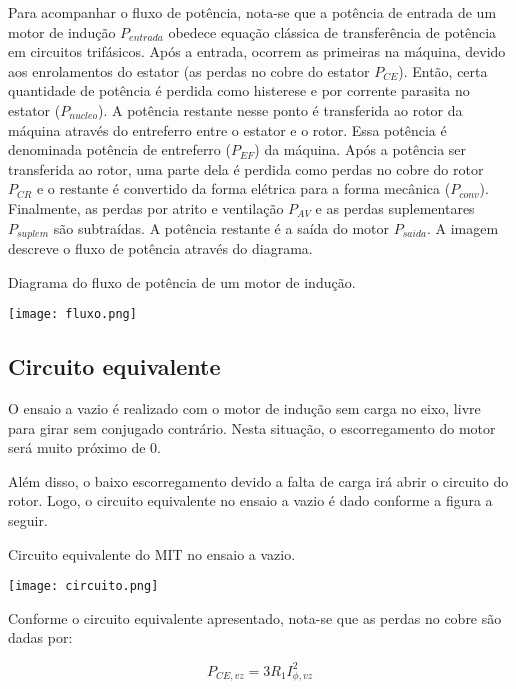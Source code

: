 \documentclass[a4paper,12pt,oneside]{article}
\begin{document}
Para acompanhar o fluxo de potência, nota-se que a potência de entrada de um motor de indução $P_{entrada}$ obedece equação clássica de transferência de potência em circuitos trifásicos. Após a entrada, ocorrem as primeiras na máquina, devido aos enrolamentos do estator (as perdas no cobre do estator $P_{CE}$). Então, certa quantidade de potência é perdida como histerese e por corrente parasita no estator ($P_{nucleo}$). A potência restante nesse ponto é transferida ao rotor da máquina através do entreferro entre o estator e o rotor. Essa potência é denominada potência de entreferro ($P_{EF}$) da máquina. Após a potência ser transferida ao rotor, uma parte dela é perdida como perdas no cobre do rotor $P_{CR}$ e o restante é convertido da forma elétrica para a forma mecânica ($P_{conv}$). Finalmente, as perdas por atrito e ventilação $P_{AV}$ e as perdas suplementares $P_{suplem}$ são subtraídas. A potência restante é a saída do motor $P_{saida}$. A imagem descreve o fluxo de potência através do diagrama.

\begin{center}
\captionsetup{type=figure}
\caption{Diagrama do fluxo de potência de um motor de indução.}
\texttt{[image: fluxo.png]}\label{fig:fluxo}
\end{center}

\subsection{Circuito equivalente}\hspace{0pt}

O ensaio a vazio é realizado com o motor de indução sem carga no eixo, livre para girar sem conjugado contrário. Nesta situação, o escorregamento do motor será muito próximo de 0.

Além disso, o baixo escorregamento devido a falta de carga irá abrir o circuito do rotor. Logo, o circuito equivalente no ensaio a vazio é dado conforme a figura a seguir.

\begin{center}
\captionsetup{type=figure}
\caption{Circuito equivalente do MIT no ensaio a vazio.}
\texttt{[image: circuito.png]}\label{fig:circuito}
\end{center}

Conforme o circuito equivalente apresentado, nota-se que as perdas no cobre são dadas por:

\begin{equation}
P_{CE,vz} = 3R_1 I_{\phi , vz}^2
\end{equation}
\end{document}
